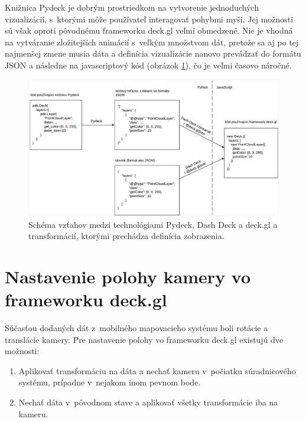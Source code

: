 Knižnica Pydeck je dobrým prostriedkom na vytvorenie jednoduchých vizualizácií, s~ktorými môže používateľ interagovať pohybmi myši. Jej možnosti sú však oproti pôvodnému frameworku deck.gl veľmi obmedzené. Nie je vhodná na vytváranie zložitejších animácií s~veľkým množstvom dát, pretože sa aj po tej najmenšej zmene musia dáta a definícia vizualizácie nanovo prevádzať do formátu JSON a následne na javascriptový kód (obrázok \ref{fig:pydeck_dashdeck_schema}), čo je veľmi časovo náročné.

\begin{figure}[h]
    \centering
    \includegraphics[width=1\linewidth]{text_prace/obrazky-figures/pydeck_dashdeck_transformacie.pdf}
    \caption{Schéma vzťahov medzi technológiami Pydeck, Dash Deck a deck.gl a transformácií, ktorými prechádza definícia zobrazenia.}
    \label{fig:pydeck_dashdeck_schema}
\end{figure}

\section{Nastavenie polohy kamery vo frameworku deck.gl}
\label{sec:nastavenie_polohy_kamery}

Súčasťou dodaných dát z~mobilného mapovacieho systému boli rotácie a translácie kamery. Pre nastavenie polohy vo frameworku deck.gl existujú dve možnosti:

\begin{enumerate}
    \item Aplikovať transformáciu na dáta a nechať kameru v~počiatku súradnicového systému, prípadne v~nejakom inom pevnom bode.
    \item Nechať dáta v~pôvodnom stave a aplikovať všetky transformácie iba na kameru.
\end{enumerate}


